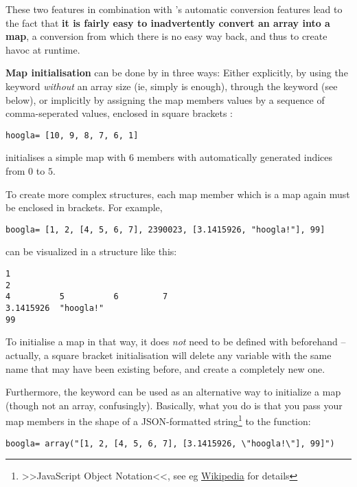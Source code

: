 These two features in combination with \SB's automatic conversion features
lead to the fact that \textbf{it is fairly easy to inadvertently convert an
array into a map}, a conversion from which there is no easy way back, and
thus to create havoc at runtime. 

\textbf{Map initialisation} can be done by in three ways: Either
explicitly, by using the  keyword \emph{without} an array size
(ie, simply  is enough), through the  keyword (see
below), or implicitly by assigning the map members values by a sequence
of comma-seperated values, enclosed in square brackets \Co{[]}:
 

\begin{lstlisting}
hoogla= [10, 9, 8, 7, 6, 1]
\end{lstlisting}

initialises a simple map  with $6$ members with automatically
generated indices from $0$ to $5$. 

To create more complex structures, each map member which is a map again
must be enclosed in brackets. For example,

\begin{lstlisting}
boogla= [1, 2, [4, 5, 6, 7], 2390023, [3.1415926, "hoogla!"], 99]
\end{lstlisting}

can be visualized in a structure like this:

\begin{lstlisting}
1
2
4          5          6         7
3.1415926  "hoogla!"
99
\end{lstlisting}

To initialise a map in that way, it does \emph{not} need to be defined
with  beforehand -- actually, a square bracket initialisation
will delete any variable with the same name that may have been existing
before, and create a completely new one.

Furthermore, the  keyword can be used as an alternative way to
initialize a map (though not an array, confusingly). Basically, what
you do is that you pass your map members in the shape of a
JSON-formatted string\footnote{>>JavaScript Object Notation<<, see eg
\href{http://en.wikipedia.org/wiki/JSON}{Wikipedia} for details}
  to the
 function:

\begin{lstlisting}
boogla= array("[1, 2, [4, 5, 6, 7], [3.1415926, \"hoogla!\"], 99]")
\end{lstlisting}


